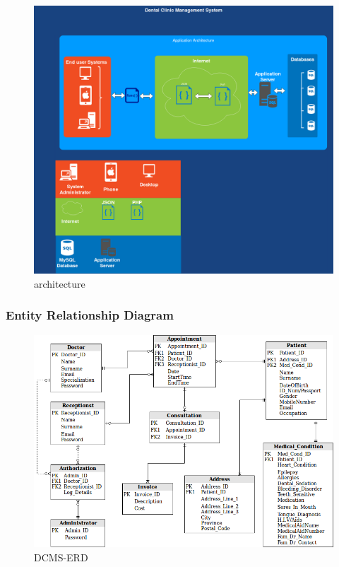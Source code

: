 \documentclass[11 pt]{article}
\begin{document}
    \begin{figure}[h]
    \centering
    
    \includegraphics[width=\linewidth]{architecture.png}
    \caption{architecture}
    \end{figure}
    \newpage
    \subsubsection{Entity Relationship Diagram}

    \begin{figure}[h]
    \centering
    
    \includegraphics[width=\linewidth]{Dentist ERD.png}
    \caption{DCMS-ERD}
    \label{fig:ERD}
    \end{figure}
    
\end{document}
